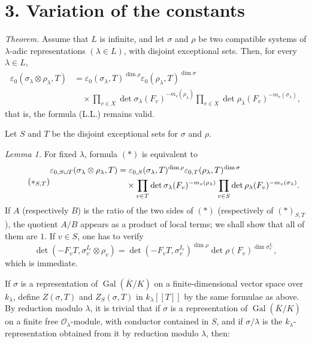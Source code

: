 \documentclass[11pt]{article}
\newcommand{\Gal}{\operatorname{Gal}}
\newcommand{\cO}{\mathcal{O}}
\newcommand{\eps}{\varepsilon}
\begin{document}
\section*{3. Variation of the constants}

\emph{Theorem.} Assume that \(L\) is infinite, and let \(\sigma\) and \(\rho\) be two compatible systems of \(\lambda\)-adic representations \((\lambda\in L)\), with disjoint exceptional sets. Then, for every \(\lambda\in L\),
\[
\tag{*}
\begin{aligned}
\eps_0(\sigma_\lambda\otimes\rho_\lambda,T)
&=\eps_0(\sigma_\lambda,T)^{\dim\rho}
  \eps_0(\rho_\lambda,T)^{\dim\sigma} \\
&\quad\times
\prod_{v\in X}\det\sigma_\lambda(F_v)^{-m_v(\rho_\lambda)}
\prod_{v\in X}\det\rho_\lambda(F_v)^{-m_v(\sigma_\lambda)},
\end{aligned}
\]
that is, the formula (L.L.) remains valid.

Let \(S\) and \(T\) be the disjoint exceptional sets for \(\sigma\) and \(\rho\).

\emph{Lemma 1.} For fixed \(\lambda\), formula \((*)\) is equivalent to
\[
\tag{\(*_{S,T}\)}
\begin{aligned}
\eps_{0,S\cup T}(\sigma_\lambda\otimes\rho_\lambda,T)
&=\eps_{0,S}(\sigma_\lambda,T)^{\dim\rho}
  \eps_{0,T}(\rho_\lambda,T)^{\dim\sigma} \\
&\quad\times
\prod_{v\in T}\det\sigma_\lambda(F_v)^{-m_v(\rho_\lambda)}
\prod_{v\in S}\det\rho_\lambda(F_v)^{-m_v(\sigma_\lambda)} .
\end{aligned}
\]
If \(A\) (respectively \(B\)) is the ratio of the two sides of \((*)\) (respectively of \((*)_{S,T}\)), the quotient \(A/B\) appears as a product of local terms; we shall show that all of them are \(1\). If \(v\in S\), one has to verify
\[
\det(-F_vT,\sigma_v^{I_v}\otimes\rho_v)
=
\det(-F_vT,\sigma_v^{I_v})^{\dim\rho}
\det\rho(F_v)^{\dim\sigma_v^{I_v}},
\]
which is immediate.

If \(\sigma\) is a representation of \(\Gal(\overline K/K)\) on a finite-dimensional vector space over \(k_\lambda\), define \(Z(\sigma,T)\) and \(Z_S(\sigma,T)\) in \(k_\lambda[[T]]\) by the same formulae as above. By reduction modulo \(\lambda\), it is trivial that if \(\sigma\) is a representation of \(\Gal(\overline K/K)\) on a finite free \(\cO_\lambda\)-module, with conductor contained in \(S\), and if \(\sigma/\lambda\) is the \(k_\lambda\)-representation obtained from it by reduction modulo \(\lambda\), then:
\end{document}
